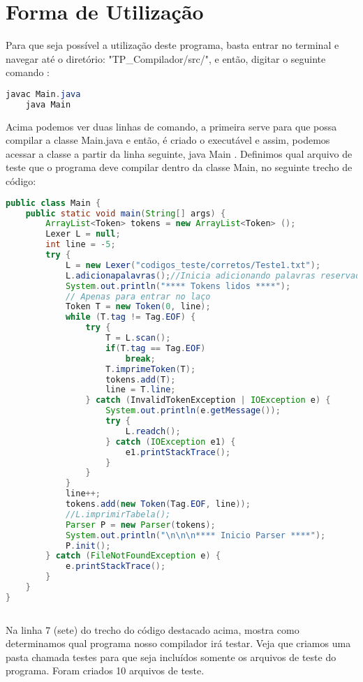 \chapter{Forma de Utilização}
\usepackage{}
Para que seja possível a utilização deste programa, basta entrar no terminal e navegar até o diretório: "TP{\_}Compilador/src/", e então, digitar o seguinte comando :
\begin{lstlisting}[language=Java, caption={Entrada terminal},label={Terminal para inicio do Programa}]
    javac Main.java
    java Main
\end{lstlisting}
Acima podemos ver duas linhas de comando, a primeira serve para que possa compilar a classe Main.java e então, é criado o executável e assim, podemos acessar a classe a partir da linha seguinte, java Main .
\newline
Definimos qual arquivo de teste que o programa deve compilar dentro da classe Main, no seguinte trecho de código:
\begin{lstlisting}[language=Java, caption={Indicando arquivo para teste},label={Terminal para inicio do Programa}]
public class Main {
	public static void main(String[] args) {
		ArrayList<Token> tokens = new ArrayList<Token> ();
		Lexer L = null;
		int line = -5;
		try {
			L = new Lexer("codigos_teste/corretos/Teste1.txt");
			L.adicionapalavras();//Inicia adicionando palavras reservadas
			System.out.println("**** Tokens lidos ****");
			// Apenas para entrar no laço
			Token T = new Token(0, line);
			while (T.tag != Tag.EOF) {
				try {
					T = L.scan();
					if(T.tag == Tag.EOF)
						break;
					T.imprimeToken(T);
					tokens.add(T);
					line = T.line;
				} catch (InvalidTokenException | IOException e) {
					System.out.println(e.getMessage());
					try {
						L.readch();
					} catch (IOException e1) {
						e1.printStackTrace();
					}
				}
			}
			line++;
			tokens.add(new Token(Tag.EOF, line));
			//L.imprimirTabela();
			Parser P = new Parser(tokens);
			System.out.println("\n\n\n**** Inicio Parser ****");
			P.init();
		} catch (FileNotFoundException e) {
			e.printStackTrace();
		}
	}
}
			
\end{lstlisting}
\newline 
Na linha 7 (sete) do trecho do código destacado acima, mostra como determinamos qual programa nosso compilador irá testar.
Veja que criamos uma pasta chamada testes para que seja incluídos somente os arquivos de teste do programa. Foram criados 10 arquivos de teste.




